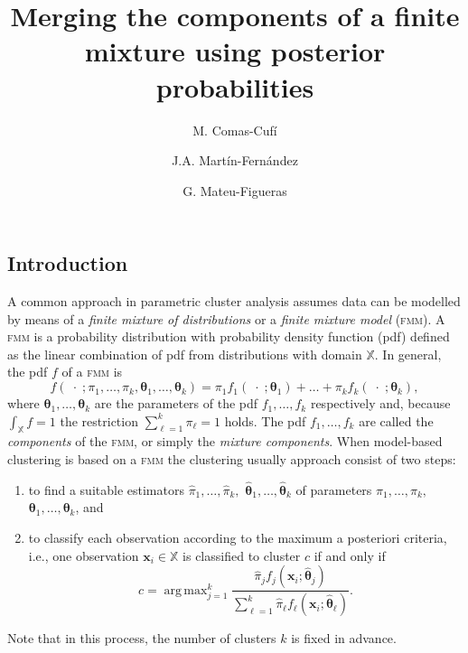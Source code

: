 \documentclass[10pt, a4paper]{article}
\title{Merging the components of a finite mixture using  posterior probabilities}
\author{M. Comas-Cufí \and J.A. Martín-Fernández \and G. Mateu-Figueras}
\DeclareMathOperator*{\argmax}{arg\,max}
\newcommand{\m}[1]{\boldsymbol{#1}}
\newcommand{\fmm}{\textsc{fmm}\xspace}
\begin{document}
\begin{spacing}{1.9}



\maketitle

\section{Introduction}


A common approach in parametric cluster analysis assumes data can be modelled by means of a \emph{finite mixture of distributions} or a \emph{finite mixture model} (\fmm). A \fmm is a probability distribution with probability density function (pdf) defined as the linear combination of pdf from distributions with domain $\mathbb{X}$. In general, the pdf $f$ of a \fmm is
\begin{equation}\label{mixt}
f(\;\cdot\; ; \pi_1, \dots, \pi_k, \m\theta_1, \dots, \m\theta_k) = \pi_1 f_1(\;\cdot\; ; \m\theta_1) + \dots + \pi_k f_k(\;\cdot\; ; \m\theta_k),
\end{equation}
where $\m\theta_1, \dots,  \m\theta_k$ are the parameters of the pdf $f_1, \dots, f_k$ respectively and, because $\int_{\mathbb{X}}f = 1$ the restriction $\sum_{\ell = 1}^k \pi_\ell = 1$ holds. The pdf $f_1, \dots, f_k$ are called the \emph{components} of the \fmm, or simply the \emph{mixture components}. When model-based clustering is based on a \fmm the clustering usually approach consist of two steps:
\begin{enumerate}
\item to find a suitable estimators $\hat{\pi}_1, \dots, \hat{\pi}_k,$ $\hat{\m\theta}_1, \dots, \hat{\m\theta}_k$ of parameters $\pi_1, \dots, \pi_k,$ $\m\theta_1, \dots, \m\theta_k$, and
\item to classify each observation according to the maximum a posteriori criteria, i.e., one observation $\m x_i \in \mathbb{X}$ is classified to cluster $c$ if and only if
\begin{equation}\label{map_criteria}
c=\argmax_{j=1}^k \frac{ \hat{\pi}_j f_j(\m x_i ; \hat{\m\theta}_j) }{\sum_{\ell=1}^k \hat{\pi}_\ell f_\ell(\m x_i ; \hat{\m\theta}_\ell) }.
\end{equation}
\end{enumerate}
Note that in this process, the number of clusters $k$ is fixed in advance. 


\end{spacing}
\end{document}
